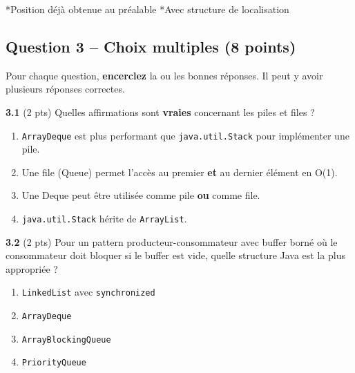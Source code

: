 \documentclass[11pt,letterpaper]{article}
\begin{document}
\vspace{0.5em}
\small{*Position déjà obtenue au préalable \quad **Avec structure de localisation}

\vspace{3cm}

\subsection*{Question 3 -- Choix multiples (8 points)}

Pour chaque question, \textbf{encerclez} la ou les bonnes réponses. Il peut y avoir plusieurs réponses correctes.

\vspace{0.5em}

\textbf{3.1} (2 pts) Quelles affirmations sont \textbf{vraies} concernant les piles et files ?

\begin{enumerate}[label=\Alph*)]
    \item \texttt{ArrayDeque} est plus performant que \texttt{java.util.Stack} pour implémenter une pile.
    \item Une file (Queue) permet l'accès au premier \textbf{et} au dernier élément en O(1).
    \item Une Deque peut être utilisée comme pile \textbf{ou} comme file.
    \item \texttt{java.util.Stack} hérite de \texttt{ArrayList}.
\end{enumerate}

\vspace{1.5cm}

\textbf{3.2} (2 pts) Pour un pattern producteur-consommateur avec buffer borné où le consommateur doit bloquer si le buffer est vide, quelle structure Java est la plus appropriée ?

\begin{enumerate}[label=\Alph*)]
    \item \texttt{LinkedList} avec \texttt{synchronized}
    \item \texttt{ArrayDeque}
    \item \texttt{ArrayBlockingQueue}
    \item \texttt{PriorityQueue}
\end{enumerate}

\vspace{1.5cm}
\end{document}
